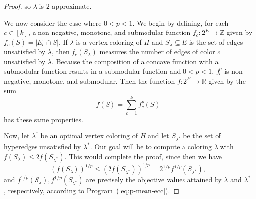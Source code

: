 \begin{proof}
    so $\lambda$ is $2$-approximate.

    We now consider the case where $0 < p < 1$.
    We begin by defining, for each $c \in [k]$, a non-negative, monotone, and submodular function $f_c\colon 2^E \rightarrow \mathbb{Z}$ given by $f_c(S) = |E_c \cap S|$.
    If $\lambda$ is a vertex coloring of $H$ and $S_\lambda \subseteq E$ is the set of edges unsatisfied by $\lambda$, then $f_c(S_\lambda)$ measures the number of edges of color $c$ unsatisfied by $\lambda$.
    Because the composition of a concave function with a submodular function results in a submodular function and $0 < p < 1$, $f_c^p$ is non-negative, monotone, and submodular.
    Then the function $f\colon 2^E \rightarrow \mathbb{R}$ given by the sum
    \[
        f(S) = \sum_{c=1}^{k} f_c^p(S)
    \]
    has these same properties.

    Now, let $\lambda^*$ be an optimal vertex coloring of $H$ and let $S_{\lambda^*}$ be the set of hyperedges unsatisfied by $\lambda^*$.
    Our goal will be to compute a coloring $\lambda$ with $f(S_\lambda) \leq 2f(S_{\lambda^*})$.
    This would complete the proof, since then we have
    \[
        (f(S_\lambda))^{1/p} \leq (2f(S_{\lambda^*}))^{1/p} = 2^{1/p}f^{1/p}(S_{\lambda^*}),
    \]
    and $f^{1/p}(S_{\lambda}), f^{1/p}(S_{\lambda^*})$ are precisely the objective values attained by $\lambda$ and $\lambda^*$, respectively, according to Program~(\ref{eq:p-mean-ecc}).



\end{proof}
